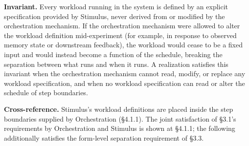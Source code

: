   \textbf{Invariant.} Every workload running in the system is defined by an explicit specification provided by Stimulus, never derived from or modified by the orchestration mechanism. If the orchestration mechanism were allowed to alter the workload definition mid-experiment (for example, in response to observed memory state or downstream feedback), the workload would cease to be a fixed input and would instead become a function of the schedule, breaking the separation between what runs and when it runs. A realization satisfies this invariant when the orchestration mechanism cannot read, modify, or replace any workload specification, and when no workload specification can read or alter the schedule of step boundaries.

  \textbf{Cross-reference.} Stimulus's workload definitions are placed inside the step boundaries supplied by Orchestration (\S4.1.1). The joint satisfaction of \S3.1's requirements by Orchestration and Stimulus is shown at \S4.1.1; the following additionally satisfies the form-level separation requirement of \S3.3.

